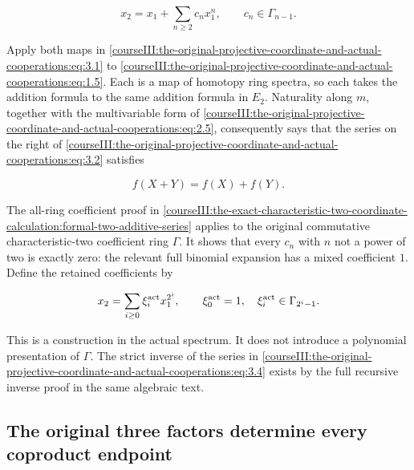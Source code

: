\begin{equation}
x_2=x_1+\sum_{n\geq2}c_nx_1^n,
 \qquad c_n\in\Gamma_{n-1}.
 \label{courseIII:the-original-projective-coordinate-and-actual-cooperations:eq:3.2}
\end{equation}

Apply both maps in \eqref{courseIII:the-original-projective-coordinate-and-actual-cooperations:eq:3.1} to \eqref{courseIII:the-original-projective-coordinate-and-actual-cooperations:eq:1.5}. Each is a map of homotopy ring spectra, so each takes the addition formula to the same addition formula in \(E_2\). Naturality along \(m\), together with the multivariable form of \eqref{courseIII:the-original-projective-coordinate-and-actual-cooperations:eq:2.5}, consequently says that the series on the right of \eqref{courseIII:the-original-projective-coordinate-and-actual-cooperations:eq:3.2} satisfies

\begin{equation}
f(X+Y)=f(X)+f(Y).
 \label{courseIII:the-original-projective-coordinate-and-actual-cooperations:eq:3.3}
\end{equation}

The all-ring coefficient proof in \cref{courseIII:the-exact-characteristic-two-coordinate-calculation:formal-two-additive-series} applies to the original commutative characteristic-two coefficient ring \(\Gamma\). It shows that every \(c_n\) with \(n\) not a power of two is exactly zero: the relevant full binomial expansion has a mixed coefficient \(1\). Define the retained coefficients by

\begin{equation}
x_2=\sum_{i\geq0}\xi_i^{\rm act}x_1^{2^i},
 \qquad \xi_0^{\rm act}=1,\quad
 \xi_i^{\rm act}\in\Gamma_{2^i-1}.
 \label{courseIII:the-original-projective-coordinate-and-actual-cooperations:eq:3.4}
\end{equation}

This is a construction in the actual spectrum. It does not introduce a polynomial presentation of \(\Gamma\). The strict inverse of the series in \eqref{courseIII:the-original-projective-coordinate-and-actual-cooperations:eq:3.4} exists by the full recursive inverse proof in the same algebraic text.

\subsection{The original three factors determine every coproduct endpoint}
\label{courseIII:the-original-projective-coordinate-and-actual-cooperations:projective-actual-coproduct}

